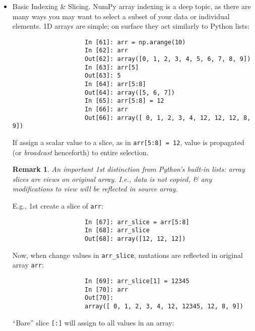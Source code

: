 \documentclass{article}
\newtheorem{remark}{Remark}
\begin{document}
\begin{enumerate}
\begin{itemize}
\begin{itemize}
\begin{itemize}
\begin{verbatim}
					
					In [57]: arr ** 2
					Out[57]:
					array([[ 1., 4., 9.],
					      [16., 25., 36.]])
				\end{verbatim}
				Comparisons between arrays of same size yield Boolean arrays:
				\begin{verbatim}
					In [58]: arr2 = np.array([[0., 4., 1.], [7., 2., 12.]])
					In [59]: arr2
					Out[59]:
					array([[ 0., 4., 1.],
					       [ 7., 2., 12.]])
					In [60]: arr2 > arr
					Out[60]:
					array([[False, True, False],
					       [ True, False, True]])
				\end{verbatim}
				Evaluating operations between differently sized arrays is called {\it broadcasting} (see Appendix A). Having a deep understanding of broadcasting is not necessary for most of this book.
				\item {\sf Basic Indexing \& Slicing.} NumPy array indexing is a deep topic, as there are many ways you may want to select a subset of your data or individual elements. 1D arrays are simple; on surface they act similarly to Python lists:
				\begin{verbatim}
					In [61]: arr = np.arange(10)
					In [62]: arr
					Out[62]: array([0, 1, 2, 3, 4, 5, 6, 7, 8, 9])
					In [63]: arr[5]
					Out[63]: 5
					In [64]: arr[5:8]
					Out[64]: array([5, 6, 7])
					In [65]: arr[5:8] = 12
					In [66]: arr
					Out[66]: array([ 0, 1, 2, 3, 4, 12, 12, 12, 8, 9])	
				\end{verbatim}
				If assign a scalar value to a slice, as in {\tt arr[5:8] = 12}, value is propagated (or {\it broadcast} henceforth) to entire selection.
				\begin{remark}
					An important 1st distinction from Python's built-in lists: array slices are views on original array. I.e., data is not copied, \& any modifications to view will be reflected in source array.
				\end{remark}
				E.g., 1st create a slice of {\tt arr}:
				\begin{verbatim}
					In [67]: arr_slice = arr[5:8]
					In [68]: arr_slice
					Out[68]: array([12, 12, 12])
				\end{verbatim}
				Now, when change values in \verb|arr_slice|, mutations are reflected in original array {\tt arr}:
				\begin{verbatim}
					In [69]: arr_slice[1] = 12345
					In [70]: arr
					Out[70]:
					array([ 0, 1, 2, 3, 4, 12, 12345, 12, 8, 9])
				\end{verbatim}
				``Bare'' slice {\tt[:]} will assign to all values in an array:

\end{itemize}
\end{itemize}
\end{itemize}
\end{enumerate}
\end{document}
